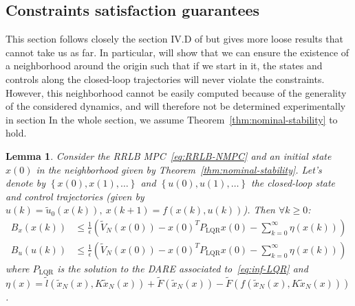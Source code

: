 \documentclass[journal]{IEEEtran}
\newtheorem{lemma}[theorem]{Lemma}
\theoremstyle{definition}
\theoremstyle{remark}
\def\rm#1{\mathrm{#1}}
\begin{document}
\subsection{Constraints satisfaction guarantees}\label{sec:constraints-satisfaction-guarantees}
This section follows closely the section IV.D of \cite{RRLB-linear-MPC} but gives more loose results that cannot take us as far.
In particular, will show that we can ensure the existence of a neighborhood around the origin such that if we start in it, the states and controls along the closed-loop trajectories will never violate the constraints.
However, this neighborhood cannot be easily computed because of the generality of the considered dynamics, and will therefore not be determined experimentally in section %
In the whole section, we assume Theorem~\ref{thm:nominal-stability} to hold.

\begin{lemma}
	\label{thm:RRLB-bounds-guarantees}
	Consider the RRLB MPC~\ref{eq:RRLB-NMPC} and an initial state $x(0)$ in the neighborhood given by Theorem~\ref{thm:nominal-stability}.
	Let's denote by $\left\{x(0),x(1),\ldots\right\}$ and $\left\{u(0), u(1),\ldots\right\}$ the closed-loop state and control trajectories (given by $u(k)=\tilde{u}_0(x(k)),~x(k+1)=f(x(k),u(k))$).
	Then $\forall k\geq 0$:
	\begin{align*}
		B_x(x(k))&\leq\frac{1}{\epsilon}\left(\tilde{V}_N(x(0))-x(0)^TP_{\rm{LQR}}x(0)-\sum_{k=0}^\infty\eta(x(k))\right)\\
		B_u(u(k))&\leq\frac{1}{\epsilon}\left(\tilde{V}_N(x(0))-x(0)^TP_{\rm{LQR}}x(0)-\sum_{k=0}^\infty\eta(x(k))\right)
	\end{align*}
	where $P_{\rm{LQR}}$ is the solution to the DARE associated to~\ref{eq:inf-LQR} and $\eta(x)=\tilde{l}(\tilde{x}_N(x),K\tilde{x}_N(x))+\tilde{F}(\tilde{x}_N(x))-\tilde{F}(f(\tilde{x}_N(x), K\tilde{x}_N(x)))$.
\end{lemma}
\end{document}
